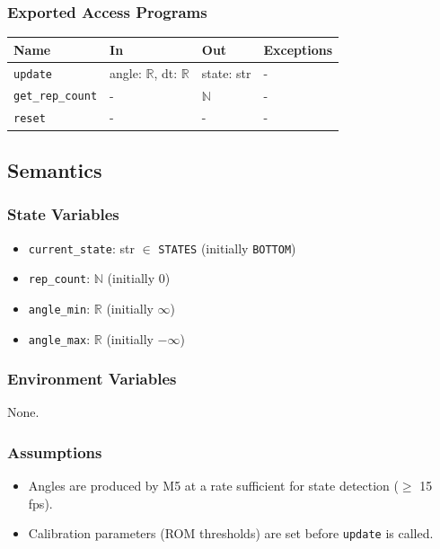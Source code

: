 \documentclass[12pt, titlepage]{article}
\begin{document}
\subsubsection{Exported Access Programs}

\begin{center}
\begin{tabular}{p{3.5cm} p{4cm} p{3cm} p{2cm}}
\hline
\textbf{Name} & \textbf{In} & \textbf{Out} & \textbf{Exceptions} \\
\hline
\texttt{update} & angle: $\mathbb{R}$, dt: $\mathbb{R}$ & state: str & - \\
\texttt{get\_rep\_count} & - & $\mathbb{N}$ & - \\
\texttt{reset} & - & - & - \\
\hline
\end{tabular}
\end{center}

\subsection{Semantics}

\subsubsection{State Variables}
\begin{itemize}
  \item \texttt{current\_state}: str $\in$ \texttt{STATES} (initially \texttt{BOTTOM})
  \item \texttt{rep\_count}: $\mathbb{N}$ (initially 0)
  \item \texttt{angle\_min}: $\mathbb{R}$ (initially $\infty$)
  \item \texttt{angle\_max}: $\mathbb{R}$ (initially $-\infty$)
\end{itemize}

\subsubsection{Environment Variables}
None.

\subsubsection{Assumptions}
\begin{itemize}
  \item Angles are produced by M5 at a rate sufficient for state detection ($\geq$ 15 fps).
  \item Calibration parameters (ROM thresholds) are set before \texttt{update} is called.
\end{itemize}
\end{document}
